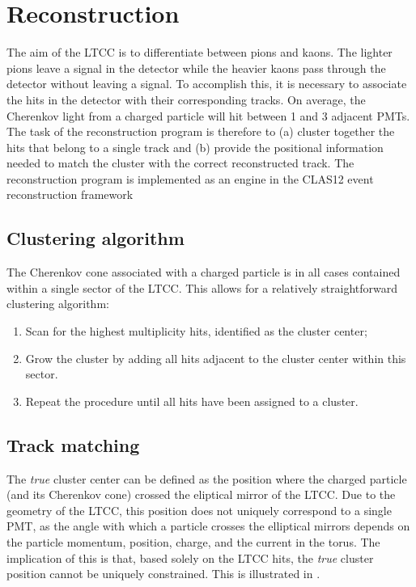 \section{Reconstruction}

The aim of the LTCC is to differentiate between pions and kaons. The lighter pions
leave a signal in the detector while the heavier kaons pass through the detector without
leaving a signal.
To accomplish this, it is necessary to associate the hits in the detector with their
corresponding tracks.
On average, the Cherenkov light from a charged particle will hit between 1 and 3
adjacent PMTs.
The task of the reconstruction program is therefore to (a) cluster together the hits that
belong to a single track and (b) provide the positional information needed to match the
cluster with the correct reconstructed track.
The reconstruction program is implemented as an engine in the CLAS12 event reconstruction framework \cite{recon-nim}

\subsection{Clustering algorithm}
The Cherenkov cone associated with a charged particle is in all cases contained within a
single sector of the LTCC. This allows for a relatively straightforward clustering
algorithm:
\begin{enumerate}
	\item Scan for the highest multiplicity hits, identified as the cluster center;
    \item Grow the cluster by adding all hits adjacent to the cluster center within this
      sector.
    \item Repeat the procedure until all hits have been assigned to a cluster.
\end{enumerate}

\subsection{Track matching}

The \textit{true} cluster center can be defined as the position where the charged particle
(and its Cherenkov cone) crossed the eliptical mirror of the LTCC.
Due to the geometry of the LTCC, this position does not uniquely correspond to a single
PMT, as the angle with which a particle crosses the elliptical mirrors depends on the
particle momentum, position, charge, and the current in the torus.
The implication of this is that, based solely on the LTCC hits, the \textit{true} cluster
position cannot be uniquely constrained.
This is illustrated in .

